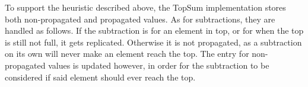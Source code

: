 \documentclass{vldb}
\newcommand{\grumbler}[2]{{\color{red}{\bf #1:} #2}}
\renewcommand{\grumbler}[2]{}
\newcommand{\andre}[1]{\grumbler{andre}{#1}}
\begin{document}
\andre{We apply the same heuristic as defined in \cite{Cabrita17Nonuniform}. Should I mention that?}

To support the heuristic described above, the TopSum implementation stores both non-propagated and propagated values.
As for subtractions, they are handled as follows.
If the subtraction is for an element in top, or for when the top is still not full, it gets replicated.
Otherwise it is not propagated, as a subtraction on its own will never make an element reach the top.
The entry for non-propagated values is updated however, in order for the subtraction to be considered if said element should ever reach the top.

 


%
%
%
%
\end{document}
